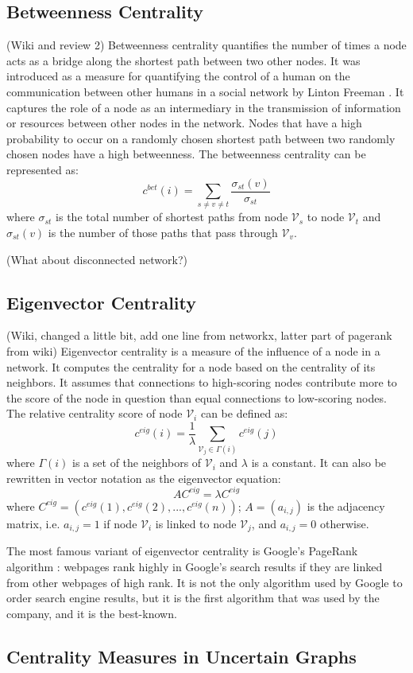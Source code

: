 \documentclass[\main/thesis.tex]{subfiles}
\begin{document}
\subsection{Betweenness Centrality}
(Wiki and review 2) Betweenness centrality quantifies the number of times a node acts as a bridge along the shortest path between two other nodes. It was introduced as a measure for quantifying the control of a human on the communication between other humans in a social network by Linton Freeman \cite{freeman1977set}. It captures the role of a node as an intermediary in the transmission of information or resources between other nodes in the network. Nodes that have a high probability to occur on a randomly chosen shortest path between two randomly chosen nodes have a high betweenness. The betweenness centrality can be represented as:
\begin{equation}
c^{bet}(i) = \sum_{s\neq v \neq t}\frac{\sigma_{st}(v)}{\sigma_{st}}
\end{equation}
where $\sigma_{st}$ is the total number of shortest paths from node $\mathcal{V}_s$ to node $\mathcal{V}_t$ and $\sigma_{st}(v)$ is the number of those paths that pass through $\mathcal{V}_v$.

(What about disconnected network?)
\subsection{Eigenvector Centrality}
(Wiki, changed a little bit, add one line from networkx, latter part of pagerank from wiki) Eigenvector centrality \cite{bonacich1987power} is a measure of the influence of a node in a network. It computes the centrality for a node based on the centrality of its neighbors. It assumes that connections to high-scoring nodes contribute more to the score of the node in question than equal connections to low-scoring nodes. The relative centrality score of node $\mathcal{V}_i$ can be defined as:
\begin{equation}
c^{eig}(i) = \frac{1}{\lambda}\sum_{\mathcal{V}_j\in \Gamma(i)}c^{eig}(j)
\end{equation}
where $\Gamma(i)$ is a set of the neighbors of $\mathcal{V}_i$ and $\lambda$ is a constant. It can also be rewritten in vector notation as the eigenvector equation:
\begin{equation}
AC^{eig}=\lambda C^{eig}
\end{equation}
where $C^{eig} = (c^{eig}(1),c^{eig}(2),...,c^{eig}(n))$; $A=(a_{i,j})$ is the adjacency matrix, i.e. $a_{i,j}=1$ if node $\mathcal{V}_i$ is linked to node $\mathcal{V}_j$, and $a_{i,j}=0$ otherwise.

The most famous variant of eigenvector centrality is Google's PageRank algorithm \cite{page1999pagerank}: webpages rank highly in Google’s search results if they are linked from other webpages of high rank. It is not the only algorithm used by Google to order search engine results, but it is the first algorithm that was used by the company, and it is the best-known.

\subsection{Centrality Measures in Uncertain Graphs}
\end{document}
